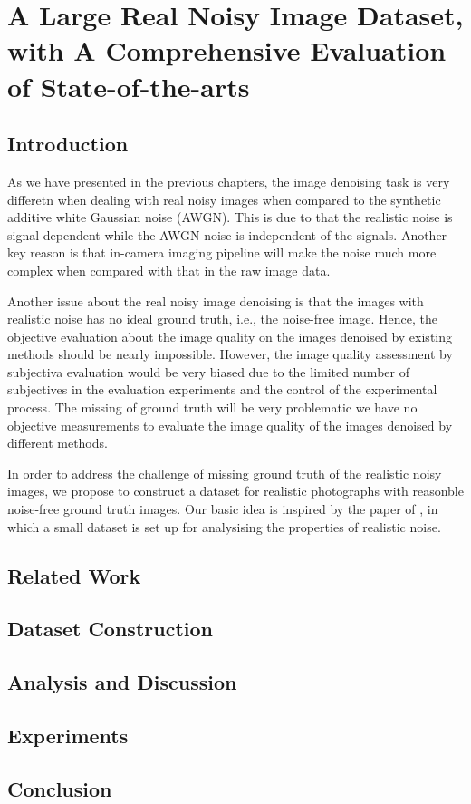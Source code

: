 %
\chapter{A Large Real Noisy Image Dataset, with A Comprehensive Evaluation of State-of-the-arts}
\label{sec:dataset}

\section{Introduction}

As we have presented in the previous chapters, the image denoising task is very differetn when dealing with real noisy images when compared to the synthetic additive white Gaussian noise (AWGN). This is due to that the realistic noise is signal dependent while the AWGN noise is independent of the signals. Another key reason is that in-camera imaging pipeline will make the noise much more complex when compared with that in the raw image data.

Another issue about the real noisy image denoising is that the images with realistic noise has no ideal ground truth, i.e., the noise-free image. Hence, the objective evaluation about the image quality on the images denoised by existing methods should be nearly impossible. However, the image quality assessment by subjectiva evaluation would be very biased due to the limited number of subjectives in the evaluation experiments and the control of the experimental process. The missing of ground truth will be very problematic we have no objective measurements to evaluate the image quality of the images denoised by different methods. 

In order to address the challenge of missing ground truth of the realistic noisy images, we propose to construct a dataset for realistic photographs with reasonble noise-free ground truth images. Our basic idea is inspired by the paper of \cite{crosschannel}, in which a small dataset is set up for analysising the properties of realistic noise.


\section{Related Work}



\section{Dataset Construction}


\section{Analysis and Discussion}


\section{Experiments}










\section{Conclusion}